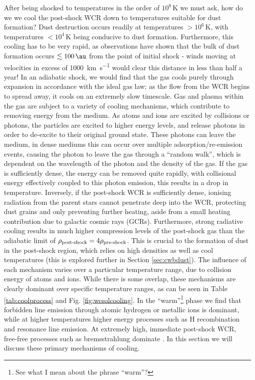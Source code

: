 After being shocked to temperatures in the order of $10^8\,\si{\kelvin}$ we must ask, how do we we cool the post-shock WCR down to temperatures suitable for dust formation?
Dust destruction occurs readily at temperatures $>10^6\, \si{\kelvin}$, with temperatures $<10^4\,\si{\kelvin}$ being conducive to dust formation.
Furthermore, this cooling has to be very rapid, as observations have shown that the bulk of dust formation occurs $\lesssim \SI{100}{\au}$ from the point of initial shock - winds moving at velocities in excess of \SI{1000}{\kilo\metre\per\second} would clear this distance in less than half a year!
In an adiabatic shock, we would find that the gas cools purely through expansion in accordance with the ideal gas law; as the flow from the WCR begins to spread away, it cools on an extremely slow timescale.
Gas and plasma within the gas are subject to a variety of cooling mechanisms, which contribute to removing energy from the medium.
As atoms and ions are excited by collisions or photons, the particles are excited to higher energy levels, and release photons in order to de-excite to their original ground state.
These photons can leave the medium, in dense mediums this can occur over multiple adsorption/re-emission events, causing the photon to leave the gas through a ``random walk'', which is dependent on the wavelength of the photon and the density of the gas.
If the gas is sufficiently dense, the energy can be removed quite rapidly, with collisional energy effectively coupled to this photon emission, this results in a drop in temperature.
Inversely, if the post-shock WCR is sufficiently dense, ionising radiation from the parent stars cannot penetrate deep into the WCR, protecting dust grains and only preventing further heating, aside from a small heating contribution due to galactic cosmic rays (GCRs).
Furthermore, strong radiative cooling results in much higher compression levels of the post-shock gas than the adiabatic limit of $\rho_\text{post-shock} = 4\rho_\text{pre-shock}$.
This is crucial to the formation of dust in the post-shock region, which relies on high densities as well as cool temperatures (this is explored further in Section \ref{sec:cwbdust}).
The influence of each mechanism varies over a particular temperature range, due to collision energy of atoms and ions.
While there is some overlap, these mechanisms are clearly dominant over specific temperature ranges, as can be seen in Table \ref{tab:coolprocess} and Fig. \ref{fig:wcsolcooling}.
In the ``warm''\footnote{See what I mean about the phrase ``warm''?} phase we find that forbidden line emission through atomic hydrogen or metallic ions is dominant, while at higher temperatures higher energy processes such as H recombination and resonance line emission.
At extremely high, immediate post-shock WCR, free-free processes such as bremsstrahlung dominate
\parencite[Ch.~6]{dysonPhysicsInterstellarMedium2021}.
In this section we will discuss these primary mechanisms of cooling.


